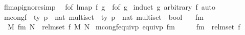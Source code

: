 \begin{isabellebody}
\isanewline
\isanewline
{}\isamarkupfalse%
\ f{\isacharunderscore}{\kern0pt}lmap{\isacharunderscore}{\kern0pt}ignore{\isacharbrackleft}{\kern0pt}simp{\isacharbrackright}{\kern0pt}{\isacharcolon}{\kern0pt}\isanewline
\ \ {\isachardoublequoteopen}f{\isacharunderscore}{\kern0pt}of\ {\isacharparenleft}{\kern0pt}lmap\ f\ g{\isacharparenright}{\kern0pt}\ {\isacharequal}{\kern0pt}\ f{\isacharunderscore}{\kern0pt}of\ g{\isachardoublequoteclose}\isanewline
%
\isadelimproof
%
\endisadelimproof
%
\isatagproof
{}\isamarkupfalse%
\ {\isacharparenleft}{\kern0pt}induct\ g\ arbitrary{\isacharcolon}{\kern0pt}\ f{\isacharparenright}{\kern0pt}\ auto%
\endisatagproof
{\isafoldproof}%
%
\isadelimproof
\isanewline
%
\endisadelimproof
\isanewline
\isanewline
{}\isamarkupfalse%
\ mcong{\isacharunderscore}{\kern0pt}f\ {\isacharcolon}{\kern0pt}{\isacharcolon}{\kern0pt}\ {\isachardoublequoteopen}{\isacharparenleft}{\kern0pt}{\isacharprime}{\kern0pt}ty\ p\ {\isacharasterisk}{\kern0pt}\ nat{\isacharparenright}{\kern0pt}\ multiset\ {\isacharequal}{\kern0pt}{\isachargreater}{\kern0pt}\ {\isacharparenleft}{\kern0pt}{\isacharprime}{\kern0pt}ty\ p\ {\isacharasterisk}{\kern0pt}\ nat{\isacharparenright}{\kern0pt}\ multiset\ {\isacharequal}{\kern0pt}{\isachargreater}{\kern0pt}\ bool{\isachardoublequoteclose}\isanewline
\ \ {\isacharparenleft}{\kern0pt}\ {\isachardoublequoteopen}{\isasymsimeq}fm{\isachardoublequoteclose}\ {}{}{\isacharparenright}{\kern0pt}\isanewline
{}\isanewline
\ \ {\isachardoublequoteopen}M\ {\isasymsimeq}fm\ N\ {\isasymequiv}\ rel{\isacharunderscore}{\kern0pt}mset\ {\isacharparenleft}{\kern0pt}{\isasymsimeq}f{\isacharparenright}{\kern0pt}\ M\ N{\isachardoublequoteclose}\isanewline
\isanewline
{}\isamarkupfalse%
\ mcong{\isacharunderscore}{\kern0pt}f{\isacharunderscore}{\kern0pt}equivp{\isacharcolon}{\kern0pt}\ {\isachardoublequoteopen}equivp\ {\isacharparenleft}{\kern0pt}{\isasymsimeq}fm{\isacharparenright}{\kern0pt}{\isachardoublequoteclose}\isanewline
%
\isadelimproof
%
\endisadelimproof
%
\isatagproof
{}\isamarkupfalse%
\ {\isacharminus}{\kern0pt}\isanewline
\ \ \isamarkupfalse%
\ {\isachardoublequoteopen}{\isacharparenleft}{\kern0pt}{\isasymsimeq}fm{\isacharparenright}{\kern0pt}\ {\isacharequal}{\kern0pt}\ rel{\isacharunderscore}{\kern0pt}mset\ {\isacharparenleft}{\kern0pt}{\isasymsimeq}f{\isacharparenright}{\kern0pt}{\isachardoublequoteclose}\isanewline
\ \ \ \ \isamarkupfalse%

\end{isabellebody}
